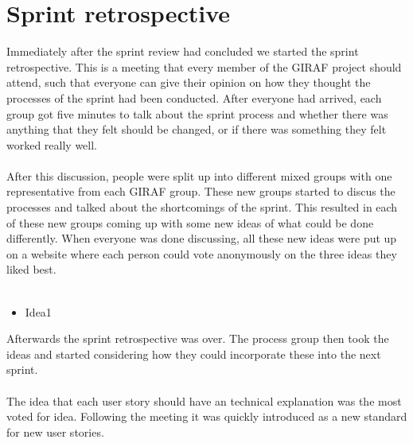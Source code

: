 \section{Sprint retrospective}
Immediately after the sprint review had concluded we started the sprint retrospective.
This is a meeting that every member of the GIRAF project should attend, such that everyone can give their opinion on how they thought the processes of the sprint had been conducted.
After everyone had arrived, each group got five minutes to talk about the sprint process and whether there was anything that they felt should be changed, or if there was something they felt worked really well.
\\\\
After this discussion, people were split up into different mixed groups with one representative from each GIRAF group.
These new groups started to discus the processes and talked about the shortcomings of the sprint.
This resulted in each of these new groups coming up with some new ideas of what could be done differently.
When everyone was done discussing, all these new ideas were put up on a website where each person could vote anonymously on the three ideas they liked best.
\\\\
\begin{itemize}
    \item Idea1
\end{itemize}
Afterwards the sprint retrospective was over.
The process group then took the ideas and started considering how they could incorporate these into the next sprint.
\\\\
The idea that each user story should have an technical explanation was the most voted for idea. 
Following the meeting it was quickly introduced as a new standard for new user stories.
